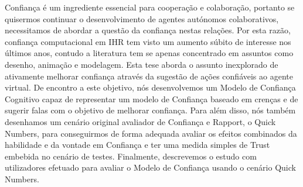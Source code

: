 \noindent Confiança é um ingrediente essencial para cooperação e colaboração, portanto se quisermos continuar o desenvolvimento de agentes autónomos colaborativos, necessitamos de abordar a questão da confiança nestas relações. Por esta razão, confiança computacional em \ac{IHR} tem visto um aumento súbito de interesse nos últimos anos, contudo a literatura tem se apenas concentrado em assuntos como desenho, animação e modelagem. Esta tese aborda o assunto inexplorado de ativamente melhorar confiança através da sugestão de ações confiáveis ao agente virtual. De encontro a este objetivo, nós desenvolvemos um Modelo de Confiança Cognitivo capaz de representar um modelo de Confiança baseado em crenças e de sugerir falas com o objetivo de melhorar confiança. Para além disso, nós também desenhamos um cenário original avaliador de Confiança e Rapport, o Quick Numbers, para conseguirmos de forma adequada avaliar os efeitos combinados da habilidade e da vontade em Confiança e ter uma medida simples de Trust embebida no cenário de testes. Finalmente, descrevemos o estudo com utilizadores efetuado para avaliar o Modelo de Confiança usando o cenário Quick Numbers.